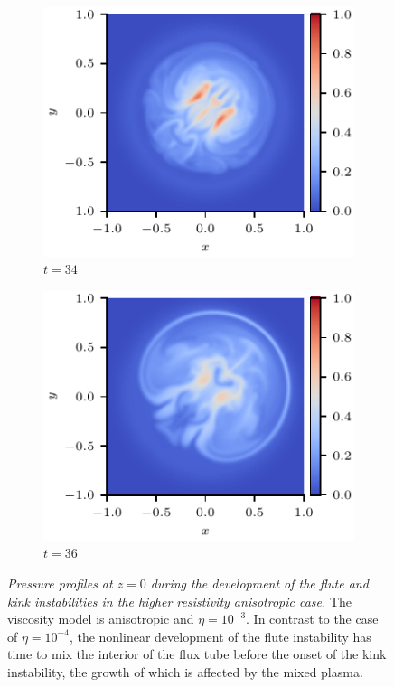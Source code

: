 \documentclass[fleqn,usenatbib]{mnras}
\newcommand{\mycaption}[2]{\caption[#1]{\emph{#1} #2}}
\begin{document}
\begin{figure}
\begin{subfigure}{0.32\textwidth}
      \includegraphics[width=\linewidth]{swi-3_pressure_17.pdf}
      \caption{$t=34$}
      \label{fig:swi-3_pressure_17}
    \end{subfigure}
    \hfill
    \begin{subfigure}{0.32\textwidth}
      \includegraphics[width=\linewidth]{swi-3_pressure_18.pdf}
      \caption{$t=36$}
      \label{fig:swi-3_pressure_18}
    \end{subfigure}
\mycaption{Pressure profiles at $z=0$ during the development of the flute and
kink instabilities in the higher resistivity anisotropic case.}{The viscosity
model is anisotropic and $\eta = 10^{-3}$. In contrast to the case of
$\eta=10^{-4}$, the nonlinear development of the flute instability has time to
mix the interior of the flux tube before the onset of the kink instability, the
growth of which is affected by the mixed plasma.}
\label{fig:kink_pressure_slices-3}%
\end{figure}
\end{document}
